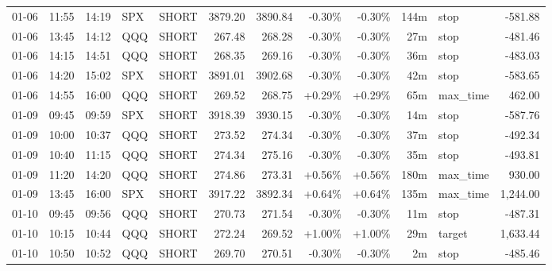 \documentclass[11pt,a4paper,twoside]{article}
\begin{document}
\begin{center}
\begin{longtable}{>{\color{txtmain}}l l l l l r r r r r >{\color{txtmain}}l r}
01-06 & 11:55 & 14:19 & SPX & SHORT & 3879.20 & 3890.84 & \textcolor{lossred}{-0.30\%} & \textcolor{lossred}{-0.30\%} & 144m & stop & \textcolor{lossred}{-581.88} \\
01-06 & 13:45 & 14:12 & QQQ & SHORT & 267.48 & 268.28 & \textcolor{lossred}{-0.30\%} & \textcolor{lossred}{-0.30\%} & 27m & stop & \textcolor{lossred}{-481.46} \\
01-06 & 14:15 & 14:51 & QQQ & SHORT & 268.35 & 269.16 & \textcolor{lossred}{-0.30\%} & \textcolor{lossred}{-0.30\%} & 36m & stop & \textcolor{lossred}{-483.03} \\
01-06 & 14:20 & 15:02 & SPX & SHORT & 3891.01 & 3902.68 & \textcolor{lossred}{-0.30\%} & \textcolor{lossred}{-0.30\%} & 42m & stop & \textcolor{lossred}{-583.65} \\
01-06 & 14:55 & 16:00 & QQQ & SHORT & 269.52 & 268.75 & \textcolor{wingreen}{+0.29\%} & \textcolor{wingreen}{+0.29\%} & 65m & max\_time & \textcolor{wingreen}{462.00} \\
01-09 & 09:45 & 09:59 & SPX & SHORT & 3918.39 & 3930.15 & \textcolor{lossred}{-0.30\%} & \textcolor{lossred}{-0.30\%} & 14m & stop & \textcolor{lossred}{-587.76} \\
01-09 & 10:00 & 10:37 & QQQ & SHORT & 273.52 & 274.34 & \textcolor{lossred}{-0.30\%} & \textcolor{lossred}{-0.30\%} & 37m & stop & \textcolor{lossred}{-492.34} \\
01-09 & 10:40 & 11:15 & QQQ & SHORT & 274.34 & 275.16 & \textcolor{lossred}{-0.30\%} & \textcolor{lossred}{-0.30\%} & 35m & stop & \textcolor{lossred}{-493.81} \\
01-09 & 11:20 & 14:20 & QQQ & SHORT & 274.86 & 273.31 & \textcolor{wingreen}{+0.56\%} & \textcolor{wingreen}{+0.56\%} & 180m & max\_time & \textcolor{wingreen}{930.00} \\
01-09 & 13:45 & 16:00 & SPX & SHORT & 3917.22 & 3892.34 & \textcolor{wingreen}{+0.64\%} & \textcolor{wingreen}{+0.64\%} & 135m & max\_time & \textcolor{wingreen}{1,244.00} \\
01-10 & 09:45 & 09:56 & QQQ & SHORT & 270.73 & 271.54 & \textcolor{lossred}{-0.30\%} & \textcolor{lossred}{-0.30\%} & 11m & stop & \textcolor{lossred}{-487.31} \\
01-10 & 10:15 & 10:44 & QQQ & SHORT & 272.24 & 269.52 & \textcolor{wingreen}{+1.00\%} & \textcolor{wingreen}{+1.00\%} & 29m & target & \textcolor{wingreen}{1,633.44} \\
01-10 & 10:50 & 10:52 & QQQ & SHORT & 269.70 & 270.51 & \textcolor{lossred}{-0.30\%} & \textcolor{lossred}{-0.30\%} & 2m & stop & \textcolor{lossred}{-485.46} \\

\end{longtable}
\end{center}
\end{document}
